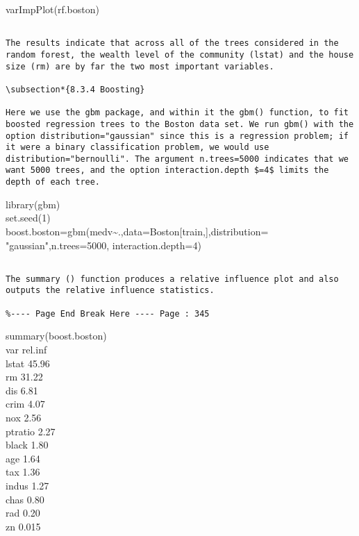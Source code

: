 \documentclass[10pt]{article}
\begin{document}
\begin{displayquote}
varImpPlot(rf.boston)
\end{displayquote}

\begin{verbatim}

The results indicate that across all of the trees considered in the random forest, the wealth level of the community (lstat) and the house size (rm) are by far the two most important variables.

\subsection*{8.3.4 Boosting}

Here we use the gbm package, and within it the gbm() function, to fit boosted regression trees to the Boston data set. We run gbm() with the option distribution="gaussian" since this is a regression problem; if it were a binary classification problem, we would use distribution="bernoulli". The argument n.trees=5000 indicates that we want 5000 trees, and the option interaction.depth $=4$ limits the depth of each tree.
\end{verbatim}

\begin{displayquote}
library(gbm)\\
set.seed(1)\\[0pt]
boost.boston=gbm(medv\~{}.,data=Boston[train,],distribution=\\
"gaussian",n.trees=5000, interaction.depth=4)
\end{displayquote}

\begin{verbatim}

The summary () function produces a relative influence plot and also outputs the relative influence statistics.

%---- Page End Break Here ---- Page : 345
\end{verbatim}

summary(boost.boston)\\
var rel.inf\\
lstat 45.96\\
rm 31.22\\
dis 6.81\\
crim 4.07\\
nox 2.56\\
ptratio 2.27\\
black 1.80\\
age 1.64\\
tax 1.36\\
indus 1.27\\
chas 0.80\\
rad 0.20\\
zn 0.015
\end{document}
